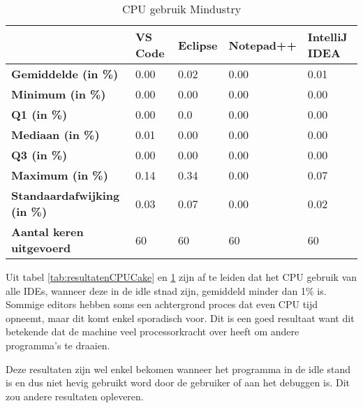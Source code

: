 \begin{table}[h]
	\centering
	\begin{tabular}{ l l l l l }
		\hline
		                                    & \textbf{VS Code} & \textbf{Eclipse} & \textbf{Notepad++} & \textbf{IntelliJ IDEA} \\
		\hline
		\textbf{Gemiddelde (in \%)}         & 0.00             & 0.02             & 0.00               & 0.01                   \\[1ex]

		\textbf{Minimum (in \%) }           & 0.00             & 0.00             & 0.00               & 0.00                   \\
		\textbf{Q1 (in \%)}                 & 0.00             & 0.0              & 0.00               & 0.00                   \\
		\textbf{Mediaan (in \%)}            & 0.01             & 0.00             & 0.00               & 0.00                   \\
		\textbf{Q3 (in \%)}                 & 0.00             & 0.00             & 0.00               & 0.00                   \\
		\textbf{Maximum (in \%)}            & 0.14             & 0.34             & 0.00               & 0.07                   \\[1ex]

		\textbf{Standaardafwijking (in \%)} & 0.03             & 0.07             & 0.00               & 0.02                   \\
		\textbf{Aantal keren uitgevoerd}    & 60               & 60               & 60                 & 60                     \\
		\hline
	\end{tabular}
	\caption{CPU gebruik Mindustry}
	\label{tab:resultatenCPUMindustry}
\end{table}

Uit tabel \ref{tab:resultatenCPUCake} en \ref{tab:resultatenCPUMindustry} zijn af te leiden dat het CPU gebruik van alle IDEs, wanneer deze in de idle stnad zijn, gemiddeld minder dan 1\% is. Sommige editors hebben soms een achtergrond proces dat even CPU tijd opneemt, maar dit komt enkel sporadisch voor. Dit is een goed resultaat want dit betekende dat de machine veel processorkracht over heeft om andere programma's te draaien.

Deze resultaten zijn wel enkel bekomen wanneer het programma in de idle stand is en dus niet hevig gebruikt word door de gebruiker of aan het debuggen is. Dit zou andere resultaten opleveren.

